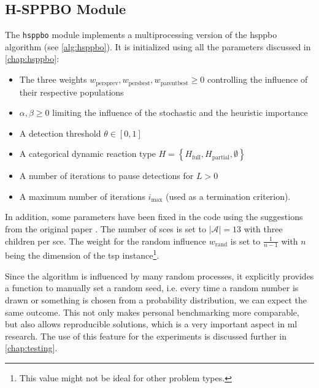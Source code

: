 \subsection{H-SPPBO Module}
\label{chap:hsppbo-module}
The \texttt{hsppbo} module implements a multiprocessing version of the \gls{hsppbo} algorithm (see \ref{alg:hsppbo}). It is initialized using all the parameters discussed in \cref{chap:hsppbo}:
\begin{itemize}
	\item The three weights $w_{\text{persprev}}, w_{\text{persbest}}, w_{\text{parentbest}} \geq 0$ controlling the influence of their respective populations
	\item $\alpha, \beta \geq 0$ limiting the influence of the stochastic and the heuristic importance
	\item A detection threshold $\theta \in [0,1]$
	\item A categorical dynamic reaction type $H = \left\lbrace H_{\text{full}}, H_{\text{partial}}, \emptyset \right\rbrace$
	\item A number of iterations to pause detections for $L > 0$
	\item A maximum number of iterations $i_{\text{max}}$ (used as a termination criterion).
\end{itemize}

In addition, some parameters have been fixed in the code using the suggestions from the original paper \cite{kupfer2021hierarchical}. The number of \glspl{sce} is set to $|\mathcal{A}| = 13$ with three children per \gls{sce}. The weight for the random influence $w_\text{rand}$ is set to $\frac{1}{n-1}$ with $n$ being the dimension of the \gls{tsp} instance\footnote{This value might not be ideal for other problem types.}.

Since the algorithm is influenced by many random processes, it explicitly provides a function to manually set a random seed, i.e. every time a random number is drawn or something is chosen from a probability distribution, we can expect the same outcome. This not only makes personal benchmarking more comparable, but also allows reproducible solutions, which is a very important aspect in \gls{ml} research. The use of this feature for the experiments is discussed further in \cref{chap:testing}.

